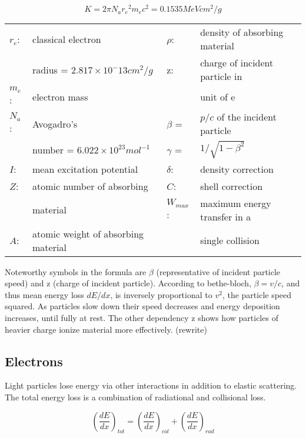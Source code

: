 \begin{equation}
  K = 2\pi N_a {r_{e}}^{2} m_e c^2 = 0.1535 MeVcm^2/g
\end{equation}

\begin{table}[H]
\rmfamily
\centering
\begin{tabular}{llll}
$r_{e}$: & classical electron & $\rho$: & density of absorbing material \\
 & radius = $2.817\times10^-13cm^2/g$ & z: & charge of incident particle in \\
$m_{e}$: & electron mass &  & unit of e \\
$N_{a}$: & Avogadro's & $\beta$ = & $p/c$ of the incident particle \\
 & number = $6.022 \times 10^{23}mol^{-1}$ & $\gamma$ = & $1/\sqrt{1-\beta^2}$ \\
$I$: & mean excitation potential & $\delta$: & density correction \\
$Z$: & atomic number of absorbing & $C$: & shell correction \\
 & material & $W_{max}$: & maximum energy transfer in a \\
$A$: & atomic weight of absorbing material &  & single collision \\

\end{tabular}
\end{table}

Noteworthy symbols in the formula are $\beta$ (representative of incident particle speed) and z (charge of incident particle).
According to bethe-bloch, $\beta = v/c$, and thus mean energy loss $dE/dx$, is inversely proportional to $v^2$, the particle speed squared. As particles slow down their speed decreases and energy deposition increases, until fully at rest. The other dependency z shows how particles of heavier charge ionize material more effectively. (rewrite)
\subsection{Electrons}
Light particles lose energy via other interactions in addition to elastic scattering. The total energy loss is a combination of radiational and collisional loss.

    \begin{equation}
      \left(\frac{dE}{dx}\right)_{tot}=\left(\frac{dE}{dx}\right)_{col}+\left(\frac{dE}{dx}\right)_{rad}
    \end{equation}

